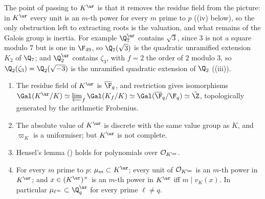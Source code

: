 The point of passing to $K^{\ur}$ is that it removes the residue field from the picture: in $K^{\ur}$ every unit is an $m$-th power for every $m$
prime to $p$ ((iv) below), so the only obstruction left to extracting roots is the valuation, and what remains of the Galois
group is inertia. For example $\Q_7^{\ur}$ contains $\sqrt3$, since $3$ is not a square modulo $7$ but is one in $\F_{49}$, so $\Q_7(\sqrt3)$ is the
quadratic unramified extension $K_2$ of $\Q_7$; and $\Q_2^{\ur}$ contains $\zeta_3$, with $f=2$ the order of $2$ modulo $3$, so $\Q_2(\zeta_3)=\Q_2(\sqrt{-3})$ is
the unramified quadratic extension of $\Q_2$ ((iii)).

\begin{proposition}\label{prop:local:qpur}
\begin{enumerate}[label=(\roman*)]
\item The residue field of $K^{\ur}$ is $\overline\F_q$, and restriction gives isomorphisms $\Gal(K^{\ur}/K)\simeq\varprojlim_f\Gal(K_f/K)\simeq\Gal(\overline\F_q/\F_q)\simeq\hat\Z$,
topologically generated by the arithmetic Frobenius.
\item The absolute value of $K^{\ur}$ is discrete with the same value group as $K$, and $\varpi_K$ is a uniformiser; but $K^{\ur}$ is not complete.
\item Hensel's lemma () holds for polynomials over $\mathcal O_{K^{\ur}}$.
\item For every $m$ prime to $p$: $\mu_m\subset K^{\ur}$; every unit of $\mathcal O_{K^{\ur}}$ is an $m$-th power in $K^{\ur}$; and $x\in(K^{\ur})^\times$ is an
$m$-th power in $K^{\ur}$ iff $m\mid v_K(x)$. In particular $\mu_{\ell^\infty}\subset\Q_q^{\ur}$ for every prime $\ell\ne q$.
\end{enumerate}
\end{proposition}

